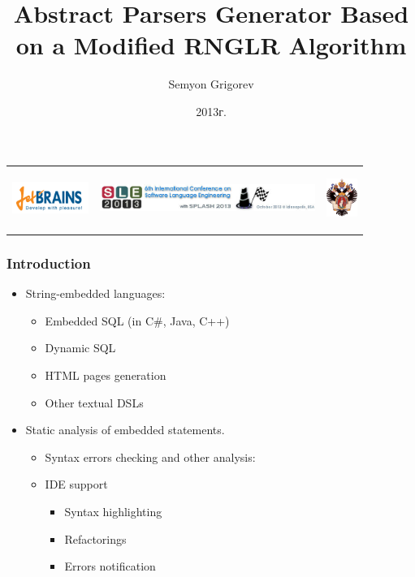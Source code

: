 \documentclass{beamer}
\title[]{Abstract Parsers Generator Based on a Modified RNGLR Algorithm}
\institute[JetBrains]{JetBrains}
\author[Semyon Grigorev]{Semyon Grigorev}
\date{2013г.}
\begin{document}
\begin{frame}
    \begin{tabular}[c с c]{m{2.5cm} m{7cm} m{1.5cm}}
        \begin{center}
        \includegraphics[width=2.5cm]{JBLogoWhite.png}
    \end{center}
    &
    \begin{center}
        \includegraphics[width=7cm]{SLE2013logo.jpg}
    \end{center}
    &
    \begin{center}
        \includegraphics[width=1cm]{SPbGU_Logo.png}
    \end{center}
    \end{tabular}
    \titlepage
\end{frame}

\begin{frame}[fragile]
	\transwipe[direction=90]
	\frametitle{Introduction}
	\begin{itemize}
		\item String-embedded languages:
		\begin{itemize}
		    \item Embedded SQL (in C\#, Java, C++)
		    \item Dynamic SQL
		    \item HTML pages generation
		    \item Other textual DSLs
    	\end{itemize}		
        \item Static analysis of embedded statements.
        \begin{itemize} 
		    \item Syntax errors checking and other analysis:
		    \item IDE support
            \begin{itemize}
    		    \item Syntax highlighting
    		    \item Refactorings
    		    \item Errors notification
        	\end{itemize}
		\end{itemize}
	\end{itemize}
\end{frame}
\end{document}
